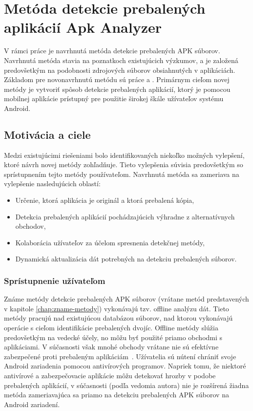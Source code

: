 \chapter{Metóda detekcie prebalených aplikácií Apk Analyzer}
\label{chap:metoda-detekcie-apk-analyzer}
V rámci práce je navrhnutá metóda detekcie prebalených APK súborov. Navrhnutá metóda stavia na poznatkoch existujúcich výzkumov, a je založená predovšetkým na podobnosti zdrojových súborov obsiahnutých v aplikáciách. Základom pre novonavrhnutú metódu sú práce  a . Primárnym cieľom novej metódy je vytvoriť spôsob detekcie prebalených aplikácií, ktorý je pomocou mobilnej aplikácie prístupný pre použitie širokej škále užívateľov systému Android.

\section{Motivácia a ciele}

Medzi existujúcimi riešeniami bolo identifikovaných niekoľko možných vylepšení, ktoré návrh novej metódy zohľadňuje. Tieto vylepšenia súvisia predovšetkým so sprístupnením tejto metódy používateľom.  Navrhnutá metóda sa zameriava na vylepšenie nasledujúcich oblastí:
\begin{itemize}
	\item Určenie, ktorá aplikácia je originál a ktorá prebalená kópia,
	\item Detekcia prebalených aplikácií pochádzajúcich výhradne z alternatívnych obchodov,
	\item Kolaborácia užívateľov za účelom spresnenia detekčnej metódy,
	\item Dynamická aktualizácia dát potrebných na detekciu prebalených súborov.
\end{itemize}

\subsection*{Sprístupnenie užívateľom}

Známe metódy detekcie prebalených APK súborov (vrátane metód predstavených v kapitole \ref{chap:zname-metody}) vykonávajú tzv. offline analýzu dát. Tieto metódy pracujú nad existujúcou databázou súborov, nad ktorou vykonávajú operácie s cieľom identifikácie prebalených dvojíc. Offline metódy slúžia predovšetkým na vedecké účely, no môžu byť použité priamo obchodmi s aplikáciami. V súčasnosti však mnohé obchody vrátane  nie sú efektívne zabezpečené proti prebaleným aplikáciám~\cite{Zhauniarovich2013}. Užívatelia sú nútení chrániť svoje Android zariadenia pomocou antivírových programov. Napriek tomu, že niektoré antivírové a zabezpečovacie aplikácie môžu detekovať hrozby v podobe prebalených aplikácií, v súčasnosti (podľa vedomia autora) nie je rozšírená žiadna metóda zameriavajúca sa priamo na detekciu prebalených APK súborov na Android zariadení.

